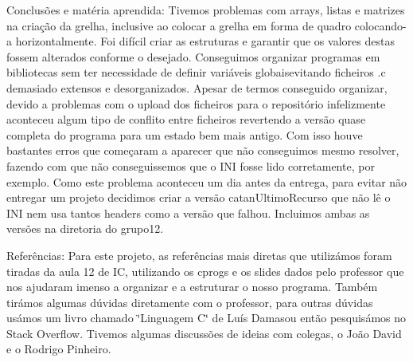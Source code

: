 Conclusões e matéria aprendida\+: Tivemos problemas com arrays, listas e matrizes na criação da grelha, inclusive ao colocar a grelha em forma de quadro colocando-\/a horizontalmente. Foi difícil criar as estruturas e garantir que os valores destas fossem alterados conforme o desejado. Conseguimos organizar programas em bibliotecas sem ter necessidade de definir variáveis globaisevitando ficheiros .c demasiado extensos e desorganizados. Apesar de termos conseguido organizar, devido a problemas com o upload dos ficheiros para o repositório infelizmente aconteceu algum tipo de conflito entre ficheiros revertendo a versão quase completa do programa para um estado bem mais antigo. Com isso houve bastantes erros que começaram a aparecer que não conseguimos mesmo resolver, fazendo com que não conseguissemos que o I\+NI fosse lido corretamente, por exemplo. Como este problema aconteceu um dia antes da entrega, para evitar não entregar um projeto decidimos criar a versão catan\+Ultimo\+Recurso que não lê o I\+NI nem usa tantos headers como a versão que falhou. Incluimos ambas as versões na diretoria do grupo12.

Referências\+: Para este projeto, as referências mais diretas que utilizámos foram tiradas da aula 12 de IC, utilizando os cprogs e os slides dados pelo professor que nos ajudaram imenso a organizar e a estruturar o nosso programa. Também tirámos algumas dúvidas diretamente com o professor, para outras dúvidas usámos um livro chamado \char`\"{}\+Linguagem C\char`\"{} de Luís Damasou então pesquisámos no Stack Overflow. Tivemos algumas discussões de ideias com colegas, o João David e o Rodrigo Pinheiro.

 